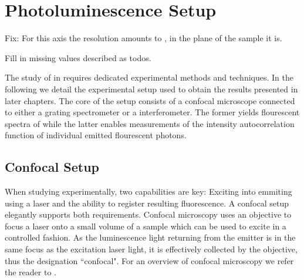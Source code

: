 
\chapter{Photoluminescence Setup}	\label{ch::pl_setup}

	\begin{remark}
		\item Fix: For this axis the resolution amounts to , in the plane of the sample it is.
		\item Fill in missing values described as todos.
	\end{remark}


	The study of \sivs in \nds requires dedicated experimental methods and techniques. In the following we detail the experimental setup used to obtain the results presented in later chapters. The core of the setup consists of a confocal microscope connected to either a grating spectrometer or a \HBT interferometer. The former yields flourescent spectra of \sivs while the latter enables measurements of the intensity autocorrelation function of individual emitted flourescent photons.

	\section{Confocal Setup} \label{sec::confocal}


		When studying \sivs experimentally, two capabilities are key: Exciting \sivs into emmiting \fl using a laser and the ability to register resulting \siv fluorescence. A confocal setup elegantly supports both requirements. Confocal microscopy uses an objective to focus a laser onto a small volume of a sample which can be used to excite \sivs in a controlled fashion. As the luminescence light returning from the emitter is in the same focus as the excitation laser light, it is effectively collected by the objective, thus the designation ``confocal". For an overview of confocal microscopy we refer the reader to \cite{janine::237}.

